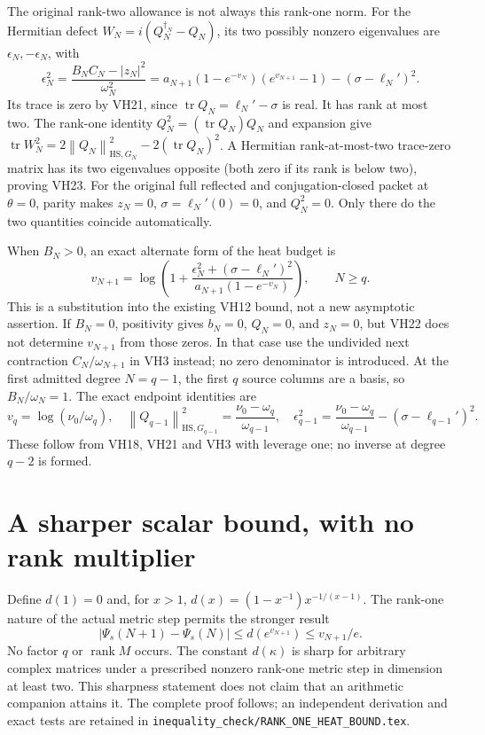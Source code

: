 \documentclass[11pt]{article}
\newcommand{\tr}{\operatorname{tr}}\newcommand{\norm}[1]{\left\lVert#1\right\rVert}
\begin{document}
The original rank-two allowance is not always this rank-one norm.
For the Hermitian defect \(W_N=i(Q_N^{\dagger_N}-Q_N)\), its two
possibly nonzero eigenvalues are \(\epsilon_N,-\epsilon_N\), with
\begin{equation}\tag{VH23}\label{VH23}
\boxed{\quad
\epsilon_N^2=\frac{B_NC_N-|z_N|^2}{\omega_N^2}
=a_{N+1}(1-e^{-v_N})(e^{v_{N+1}}-1)
-(\sigma-\ell_N')^2.\quad}
\end{equation}
Its trace is zero by VH21, since \(\tr Q_N=\ell_N'-\sigma\) is real.
It has rank at most two. The rank-one identity
\(Q_N^2=(\tr Q_N)Q_N\) and expansion give
\(\tr W_N^2=2\norm{Q_N}_{\mathrm{HS},G_N}^2-2(\tr Q_N)^2\).
A Hermitian rank-at-most-two trace-zero matrix has its two eigenvalues
opposite (both zero if its rank is below two), proving VH23.
For the original full reflected and conjugation-closed packet at
\(\theta=0\), parity makes \(z_N=0\), \(\sigma=\ell_N'(0)=0\),
and \(Q_N^2=0\). Only there do the two quantities coincide automatically.

When \(B_N>0\), an exact alternate form of the heat budget is
\begin{equation}\tag{VH24}\label{VH24}
v_{N+1}=\log\!\left(1+
\frac{\epsilon_N^2+(\sigma-\ell_N')^2}
{a_{N+1}(1-e^{-v_N})}\right),\qquad N\ge q.
\end{equation}
This is a substitution into the existing VH12 bound, not a new
asymptotic assertion. If \(B_N=0\), positivity gives \(b_N=0\),
\(Q_N=0\), and \(z_N=0\), but VH22 does not determine \(v_{N+1}\)
from those zeros. In that case use the undivided next contraction
\(C_N/\omega_{N+1}\) in VH3 instead; no zero denominator is introduced.
At the first admitted degree \(N=q-1\), the first \(q\) source columns
are a basis, so \(B_N/\omega_N=1\). The exact endpoint identities are
\begin{equation}\tag{VH25}\label{VH25}
v_q=\log(\nu_0/\omega_q),\quad
\norm{Q_{q-1}}_{\mathrm{HS},G_{q-1}}^2
=\frac{\nu_0-\omega_q}{\omega_{q-1}},\quad
\epsilon_{q-1}^2=\frac{\nu_0-\omega_q}{\omega_{q-1}}
-(\sigma-\ell_{q-1}')^2.
\end{equation}
These follow from VH18, VH21 and VH3 with leverage one; no inverse
at degree \(q-2\) is formed.

\section{A sharper scalar bound, with no rank multiplier}

Define \(d(1)=0\) and, for \(x>1\),
\(d(x)=(1-x^{-1})x^{-1/(x-1)}\). The rank-one nature of the actual
metric step permits the stronger result
\begin{equation}\tag{VH26}\label{VH26}
\boxed{\quad
|\Psi_s(N+1)-\Psi_s(N)|\le d(e^{v_{N+1}})
\le v_{N+1}/e.\quad}
\end{equation}
No factor \(q\) or \(\operatorname{rank}M\) occurs. The constant
\(d(\kappa)\) is sharp for arbitrary complex matrices under a prescribed
nonzero rank-one metric step in dimension at least two. This sharpness
statement does not claim that an arithmetic companion attains it.
The complete proof follows; an independent derivation and exact tests
are retained in \texttt{inequality\_check/RANK\_ONE\_HEAT\_BOUND.tex}.
\end{document}
